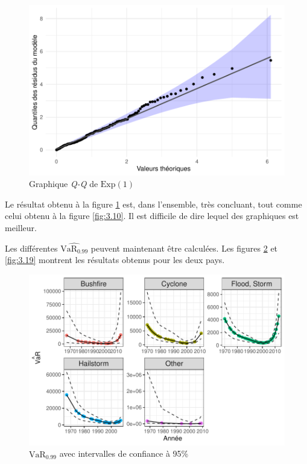 \begin{figure}[h]
\begin{center}
\includegraphics{images/fig-030}
\end{center}
\caption{Graphique \textit{Q-Q} de $\text{Exp}(1)$}
\label{fig:3.17}
\end{figure}

Le résultat obtenu à la figure \ref{fig:3.17} est, dans l'ensemble, très concluant, tout comme celui obtenu à la figure \ref{fig:3.10}. Il est difficile de dire lequel des graphiques est meilleur.


Les différentes $\widehat{\text{VaR}_{0.99}}$ peuvent maintenant être calculées. Les figures \ref{fig:3.18} et \ref{fig:3.19} montrent les résultats obtenus pour les deux pays. 
\begin{figure}[h]
\begin{center}
\includegraphics{images/fig-031}
\end{center}
\caption{$\widehat{\text{VaR}_{0.99}}$ avec intervalles de confiance à 95\%}
\label{fig:3.18}
\end{figure}

